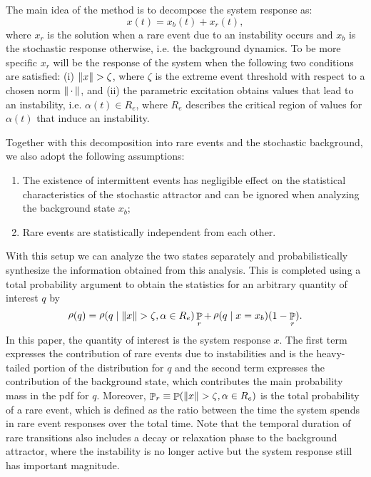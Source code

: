 \documentclass[3p]{elsarticle}
\DeclarePairedDelimiter\norm{\lVert}{\rVert}
\DeclareMathOperator{\prob}{\mathbb P}
\DeclareMathOperator{\pdf}{\rho}
\newcommand{\blank}{\,\cdot\,}
\begin{document}
The main idea of the method is to decompose the system response as:
\begin{equation}
x(t)=x_b(t)+x_r(t),
\end{equation}
where $x_r$  is the solution when a rare event due to an instability occurs and $x_b$ is the stochastic response otherwise, i.e. the background dynamics. To be more specific  $x_r$ will be the response of the system when the following two conditions are satisfied: (i) $\norm{x}>\zeta$, where $\zeta$ is the extreme event threshold with respect to a chosen norm $\norm{\blank}$, and (ii) the parametric excitation  obtains values that lead to an instability, i.e. $\alpha(t)\in R_e$, where $R_e$ describes the critical region of values for $\alpha(t)$ that induce  an instability.

Together with this decomposition into rare events and the stochastic background, we also adopt the following assumptions:
\begin{enumerate}
\item The existence of intermittent events has negligible effect on the statistical characteristics of the stochastic attractor and can be ignored when analyzing the background state $x_b$;
\item  Rare events are statistically independent from each other.
\end{enumerate}
With this setup we can analyze the two states separately and     probabilistically synthesize the information obtained from this  analysis. This is completed using a total probability argument to   obtain the statistics for an arbitrary quantity of interest  $q$   by
\begin{equation}\label{eq:probLaw}
\pdf(q) =  \pdf(q \mid {\norm{x}>\zeta,\alpha\in R_{e}} ) \prob_{r} +  \pdf(q \mid x=x_b) ( 1-\prob_{r} ).
\end{equation}
In this paper, the quantity of interest is the system response $x$. The first term expresses the contribution of   rare events due to   instabilities and is the heavy-tailed portion of the distribution for $q$ and the second term expresses the contribution of the background state, which contributes  the main      probability mass in the pdf for $q$. Moreover, $\prob_{r} \equiv \prob(\norm{x}>\zeta,\alpha\in R_{e}) $ is the total probability of a rare event, which is defined as the  ratio between the time   the system spends in rare event responses over the total time. Note that the temporal duration of rare transitions  also includes a decay or relaxation phase to the background attractor, where the instability is no longer active but the system  response  still has important magnitude. 
\end{document}

